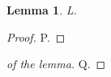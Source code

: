 \documentclass{elsarticle}
\newtheorem{lemma}{Lemma}
\begin{document}
\begin{lemma}L.\end{lemma}
\begin{proof}P.\end{proof}
\begin{proof}[of the lemma]Q.\end{proof}
\end{document}
